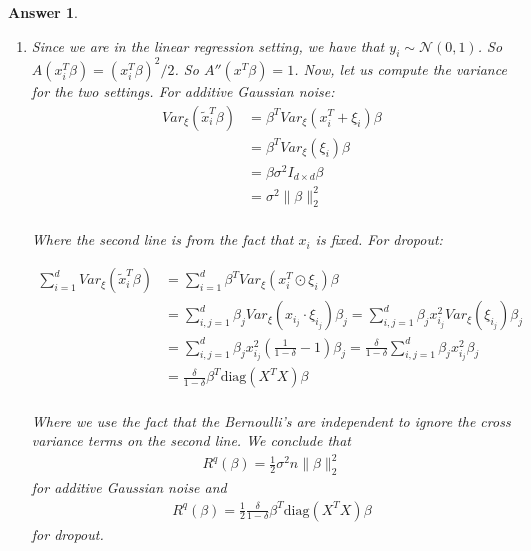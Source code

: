 \documentclass[12pt]{article}
\theoremstyle{colon}
\newtheorem*{answer}{Answer}
\begin{document}
\begin{answer}
\begin{enumerate}[label=\arabic*)]
    \item Since we are in the linear regression setting, we have that $y_i \sim \mathcal{N}(0,1)$. So $A(x_i^T \beta) = (x_i^T \beta)^2/2$. So $A''(x^T \beta) = 1$. Now, let us compute the variance for the two settings. For additive Gaussian noise:
      \begin{align*}
        Var_\xi (\tilde{x}_i^T \beta) &= \beta^T Var_\xi (x_i^T + \xi_i) \beta \\
        &= \beta^T Var_\xi (\xi_i) \beta \\
        &= \beta \sigma^2 I_{d \times d} \beta \\
        &= \sigma^2 \lVert \beta \rVert_2^2 \\
      \end{align*}

      Where the second line is from the fact that $x_i$ is fixed. For dropout:

      \begin{align*}
        \sum_{i=1}^d Var_\xi (\tilde{x}_i^T \beta) &= \sum_{i=1}^d \beta^T Var_\xi (x_i^T \odot \xi_i) \beta \\
        &= \sum_{i,j=1}^d \beta_j Var_\xi (x_{i_j} \cdot \xi_{i_j}) \beta_j = \sum_{i,j=1}^d \beta_j x_{i_j}^2 Var_\xi (\xi_{i_j}) \beta_j \\
        &= \sum_{i,j=1}^d \beta_j x_{i_j}^2 \left(\frac{1}{1-\delta} - 1 \right) \beta_j = \frac{\delta}{1-\delta} \sum_{i,j=1}^d \beta_j x_{i_j}^2 \beta_j \\
        &= \frac{\delta}{1-\delta} \beta^T \text{diag}(X^T X) \beta \\
      \end{align*}

      Where we use the fact that the Bernoulli's are independent to ignore the cross variance terms on the second line. We conclude that
        \begin{gather*}
        R^q (\beta) = \frac{1}{2} \sigma^2 n \lVert \beta \rVert_2^2
        \end{gather*}
      for additive Gaussian noise and
        \begin{gather*}
          R^q (\beta) = \frac{1}{2} \frac{\delta}{1-\delta} \beta^T \text{diag}(X^T X) \beta
        \end{gather*}
      for dropout.
  \end{enumerate}
\end{answer}

\clearpage
\end{document}
